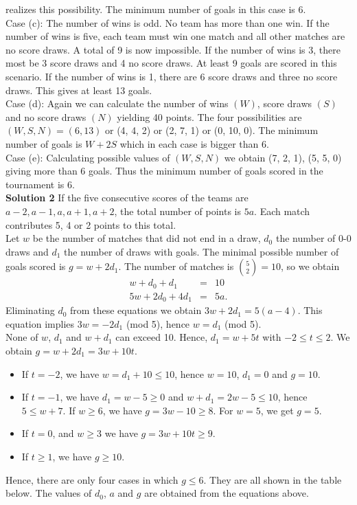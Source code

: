 \documentclass{article}
\begin{document}
\begin{enumerate}[1.]
realizes this possibility. The minimum number of goals in this case is 6.\\
Case (c): The number of wins is odd. No team has more than one win. If the number of wins is five, each team must win one match and all other matches are no score draws. A total of 9 is now impossible. If the number of wins is 3, there most be 3 score draws and 4 no score draws. At least 9 goals are scored in this scenario. If the number of wins is 1, there are 6 score draws and three no score draws. This gives at least 13 goals.\\
Case (d): Again we can calculate the number of wins $(W)$, score draws $(S)$ and no score draws $(N)$ yielding 40 points. The four possibilities are $(W, S, N) = (6, 1 3)$ or (4, 4, 2) or (2, 7, 1) or (0, 10, 0). The minimum number of goals is $W + 2S$ which in each case is bigger than 6.\\
Case (e): Calculating possible values of $(W, S, N)$ we obtain (7, 2, 1), (5, 5, 0) giving more than 6 goals.
Thus the minimum number of goals scored in the tournament is 6.\\
\newline
\textbf{Solution 2}
If the five consecutive scores of the teams are $a-2, a-1, a, a+1, a+2$, the total number of points is $5a$. Each match contributes 5, 4 or 2 points to this total.\\
Let $w$ be the number of matches that did not end in a draw, $d_0$ the number of 0-0 draws and $d_1$ the number of draws with goals. The minimal possible number of goals scored is $g = w + 2d_1$. The number of matches is ${5 \choose 2} = 10$, so we obtain
\begin{eqnarray*}
w + d_0 + d_1 & = & 10\\
5w + 2d_0 + 4d_1 & = & 5a.
\end{eqnarray*}
Eliminating $d_0$ from these equations we obtain $3w + 2d_1 = 5(a-4)$. This equation implies $3w = -2d_1$ (mod 5), hence $w = d_1$ (mod 5).\\
None of $w$, $d_1$ and $w+d_1$ can exceed 10. Hence, $d_1 = w + 5t$ with $-2 \leq t \leq 2$. We obtain $g = w + 2d_1 = 3w + 10t$.
\begin{itemize}
\item  If $t = -2$, we have $w = d_1 + 10 \leq 10$, hence $w = 10$, $d_1 = 0$ and $g = 10$.
\item  If $t = -1$, we have $d_1 = w - 5 \geq 0$ and $w + d_1 = 2w - 5 \leq 10$, hence $5 \leq w + 7$. If $w \geq 6$, we have $g = 3w - 10 \geq 8$. For $w = 5$, we get $g = 5$.
\item  If $t = 0$,  and $w \geq 3$ we have $g = 3w + 10t \geq 9$.
\item  If $t \geq 1$, we have $g \geq 10$.
\end{itemize}
Hence, there are only four cases in which $g \leq 6$. They are all shown in the table below. The values of $d_0$, $a$ and $g$ are obtained from the equations above.


\end{enumerate}
\end{document}
